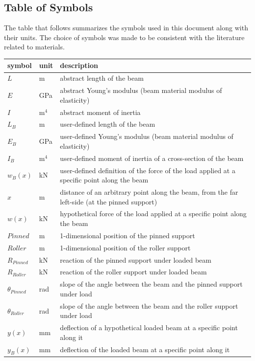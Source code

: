 \documentclass[12pt]{article}
\begin{document}
\subsection{Table of Symbols}

The table that follows summarizes the symbols used in this document along with
their units.  The choice of symbols was made to be consistent with the
literature related to materials.

\renewcommand{\arraystretch}{1.2}
\noindent
\begin{longtable*}{l l p{12cm}}
    \toprule
    \textbf{symbol} & \textbf{unit} & \textbf{description}\\
    \midrule
    \(L\) & \si{\metre} & abstract length of the beam \\
    \(E\) & \si{\giga\pascal} & abstract Young's modulus (beam material modulus of elasticity) \\
    \(I\) & \(\si{\metre{}}^{4}\) & abstract moment of inertia \\
    \(L_{B}\) & \si{\metre} & user-defined length of the beam \\
    \(E_{B}\) & \si{\giga\pascal} & user-defined Young's modulus (beam material modulus of elasticity) \\
    \(I_{B}\) & \(\si{\metre{}}^{4}\) & user-defined moment of inertia of a cross-section of the beam \\
    \(w_B(x)\) & \si{\kilo\newton} & user-defined definition of the force of the load applied at a specific point along the beam \\
    \(x\) & \si{\metre} & distance of an arbitrary point along the beam, from the far left-side (at the pinned support) \\
    \(w(x)\) & \si{\kilo\newton} & hypothetical force of the load applied at a specific point along the beam \\
    \(\mathit{Pinned}\) & \si{\metre} & 1-dimensional position of the pinned support \\
    \(\mathit{Roller}\) & \si{\metre} & 1-dimensional position of the roller support \\
    \(R_{\mathit{Pinned}}\) & \si{\kilo\newton} & reaction of the pinned support under loaded beam \\
    \(R_{\mathit{Roller}}\) & \si{\kilo\newton} & reaction of the roller support under loaded beam \\
    \(\theta{}_{\mathit{Pinned}}\) & \si{\radian} & slope of the angle between the beam and the pinned support under load \\
    \(\theta{}_{\mathit{Roller}}\) & \si{\radian} & slope of the angle between the beam and the roller support under load \\
    \(y(x)\) & \si{\milli\metre} & deflection of a hypothetical loaded beam at a specific point along it \\
    \(y_{B}(x)\) & \si{\milli\metre} & deflection of the loaded beam at a specific point along it \\
    \bottomrule
\end{longtable*}
\end{document}
